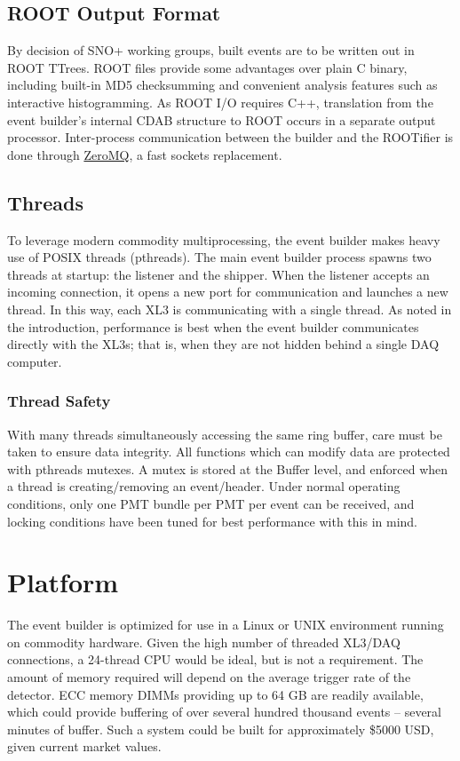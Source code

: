 \documentclass[11pt,twocolumn]{article}
\begin{document}
\subsection{ROOT Output Format}
By decision of SNO+ working groups, built events are to be written out in ROOT TTrees. ROOT files provide some advantages over plain C binary, including built-in MD5 checksumming and convenient analysis features such as interactive histogramming. As ROOT I/O requires C++, translation from the event builder's internal CDAB structure to ROOT occurs in a separate output processor. Inter-process communication between the builder and the ROOTifier is done through \href{http://www.zeromq.org/}{ZeroMQ}, a fast sockets replacement.

\subsection{Threads}
To leverage modern commodity multiprocessing, the event builder makes heavy use of POSIX threads (pthreads). The main event builder process spawns two threads at startup: the listener and the shipper. When the listener accepts an incoming connection, it opens a new port for communication and launches a new thread. In this way, each XL3 is communicating with a single thread. As noted in the introduction, performance is best when the event builder communicates directly with the XL3s; that is, when they are not hidden behind a single DAQ computer.

\subsubsection{Thread Safety}
With many threads simultaneously accessing the same ring buffer, care must be taken to ensure data integrity. All functions which can modify data are protected with pthreads mutexes. A mutex is stored at the Buffer level, and enforced when a thread is creating/removing an event/header. Under normal operating conditions, only one PMT bundle per PMT per event can be received, and locking conditions have been tuned for best performance with this in mind.

\section{Platform}
The event builder is optimized for use in a Linux or UNIX environment running on commodity hardware. Given the high number of threaded XL3/DAQ connections, a 24-thread CPU would be ideal, but is not a requirement. The amount of memory required will depend on the average trigger rate of the detector. ECC memory DIMMs providing up to 64 GB are readily available, which could provide buffering of over several hundred thousand events -- several minutes of buffer. Such a system could be built for approximately \$5000 USD, given current market values.
\end{document}
